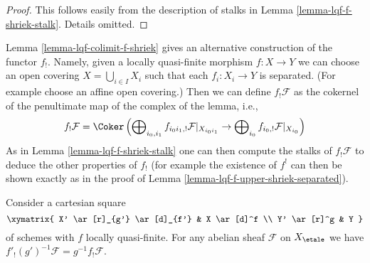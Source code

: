 \begin{proof}
This follows easily from the description of stalks in
Lemma \ref{lemma-lqf-f-shriek-stalk}. Details omitted.
\end{proof}

\begin{remark}
\label{remark-alternative-lqf-f-shriek}
Lemma \ref{lemma-lqf-colimit-f-shriek}
gives an alternative construction of the functor $f_!$.
Namely, given a locally quasi-finite morphism $f : X \to Y$
we can choose an open covering $X = \bigcup_{i \in I} X_i$
such that each $f_i : X_i \to Y$ is separated. (For example choose
an affine open covering.) Then we
can define $f_!\mathcal{F}$ as the cokernel of the penultimate map
of the complex of the lemma, i.e.,
$$
f_!\mathcal{F} = \Coker\left(
\bigoplus\nolimits_{i_0, i_1} f_{i_0i_1, !} \mathcal{F}|_{X_{i_0i_1}} \to
\bigoplus\nolimits_{i_0} f_{i_0, !} \mathcal{F}|_{X_{i_0}}
\right)
$$
As in Lemma \ref{lemma-lqf-f-shriek-stalk}
one can then compute the stalks of $f_!\mathcal{F}$
to deduce the other properties of $f_!$ (for example
the existence of $f^!$ can then be shown exactly as in
the proof of Lemma \ref{lemma-lqf-f-upper-shriek-separated}).
\end{remark}

\begin{lemma}
\label{lemma-lqf-base-change-f-shriek}
Consider a cartesian square
$$
\xymatrix{
X' \ar[r]_{g'} \ar[d]_{f'} & X \ar[d]^f \\
Y' \ar[r]^g & Y
}
$$
of schemes with $f$ locally quasi-finite. For any abelian sheaf $\mathcal{F}$
on $X_\etale$ we have $f'_!(g')^{-1}\mathcal{F} = g^{-1}f_!\mathcal{F}$.
\end{lemma}

